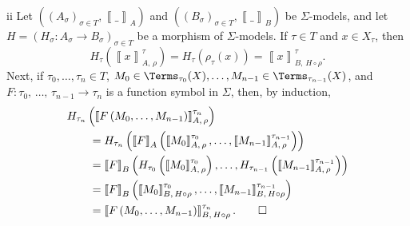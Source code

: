 \begin{partsolution}{ii}
Let \(\left(\left(A_\sigma\right)_{\sigma\in T},\left\llbracket\_\right\rrbracket_A\right)\) and \(\left(\left(B_\sigma\right)_{\sigma\in T},\left\llbracket\_\right\rrbracket_B\right)\) be \(\Sigma\)-models, and let \(H = \left(H_\sigma : A_\sigma \to B_\sigma\right)_{\sigma \in T}\) be a morphism of \(\Sigma\)-models.
If \(\tau\in T\) and \(x \in X_\tau\), then
\begin{equation*}
H_\tau\left(\left\llbracket x \right\rrbracket_{A,\,\rho}^\tau\right)
=H_\tau\left(\rho_\tau(x)\right)
=\left\llbracket x \right\rrbracket_{B,\,H \circ \rho}^\tau.
\end{equation*}
Next, if \(\tau_0,\ldots,\tau_n\in T\), \(M_0 \in \Terms_{\tau_0}(X), \ldots, M_{n-1} \in \Terms_{\tau_{n-1}}(X)\), and \(F : \tau_0,\,\ldots,\,\tau_{n-1} \to \tau_n\) is a function symbol in \(\Sigma\), then, by induction,
\begin{align*}
&H_{\tau_n}\left(\left\llbracket F\left(M_0,\ldots,M_{n-1}\right)\right\rrbracket_{A,\,\rho}^{\tau_n}\right) \\
&\qquad= H_{\tau_n}\left(\left\llbracket F\right\rrbracket_A\left(\left\llbracket M_0\right\rrbracket_{A,\,\rho}^{\tau_0},\ldots,\left\llbracket M_{n-1}\right\rrbracket_{A,\,\rho}^{\tau_{n-1}}\right)\right) \\
&\qquad= \left\llbracket F\right\rrbracket_B\left(H_{\tau_0}\left(\left\llbracket M_0\right\rrbracket_{A,\,\rho}^{\tau_0}\right),\ldots,H_{\tau_{n-1}}\left(\left\llbracket M_{n-1}\right\rrbracket_{A,\,\rho}^{\tau_{n-1}}\right)\right) \\
&\qquad= \left\llbracket F\right\rrbracket_B\left(\left\llbracket M_0\right\rrbracket_{B,\,H\circ\rho}^{\tau_0},\ldots,\left\llbracket M_{n-1}\right\rrbracket_{B,\,H\circ\rho}^{\tau_{n-1}}\right) \\
&\qquad=\left\llbracket F\left(M_0,\ldots,M_{n-1}\right) \right\rrbracket_{B,\,H \circ \rho}^{\tau_n}.
\qedhere
\end{align*}
\end{partsolution}
